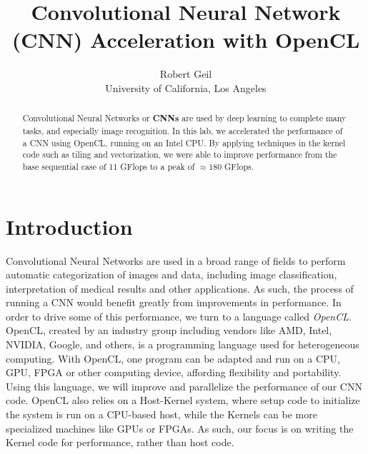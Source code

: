 \documentclass[letterpaper,twocolumn,10pt]{article}
\begin{document}

\date{}

\title{\Large \bf Convolutional Neural Network (CNN) Acceleration with OpenCL}

\author{
{\rm Robert Geil}\\
University of California, Los Angeles
} %

\maketitle

\begin{abstract}
Convolutional Neural Networks or \textbf{CNNs} are used by deep learning to
complete many tasks, and especially image recognition. In this lab, we 
accelerated the performance of a CNN using OpenCL, running on an Intel CPU. By
applying techniques in the kernel code such as tiling and vectorization, we
were able to improve performance from the base sequential case of 11 GFlops to
a peak of $\approx 180$  GFlops.
\end{abstract}

\section{Introduction}

Convolutional Neural Networks are used in a broad range of fields to perform
automatic categorization of images and data, including image classification,
interpretation of medical results and other applications. As such, the process
of running a CNN would benefit greatly from improvements in performance. In
order to drive some of this performance, we turn to a language called
\textit{OpenCL}. OpenCL, created by an industry group including vendors like
AMD, Intel, NVIDIA, Google, and others, is a programming language used for
heterogeneous computing. With OpenCL, one program can be adapted and run on a
CPU, GPU, FPGA or other computing device, affording flexibility and
portability. Using this language, we will improve and parallelize the
performance of our CNN code. OpenCL also relies on a Host-Kernel system, where
setup code to initialize the system is run on a CPU-based host, while the
Kernels can be more specialized machines like GPUs or FPGAs. As such, our focus
is on writing the Kernel code for performance, rather than host code.
\end{document}
